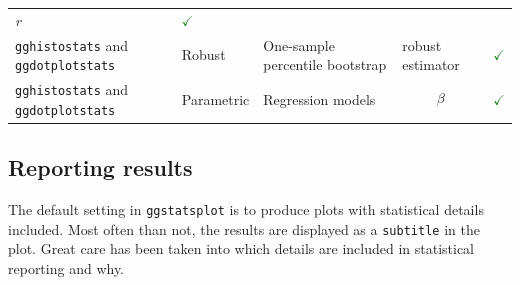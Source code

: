 \documentclass[]{article}
\begin{document}
\begin{longtable}[]{@{}lllll@{}}
\begin{minipage}[t]{0.12\columnwidth}
\emph{r}\strut
\end{minipage} & \begin{minipage}[t]{0.07\columnwidth}\raggedright
\textcolor{ForestGreen}{$\checkmark$}\strut
\end{minipage}\tabularnewline
\begin{minipage}[t]{0.20\columnwidth}\raggedright
\texttt{gghistostats} and \texttt{ggdotplotstats}\strut
\end{minipage} & \begin{minipage}[t]{0.16\columnwidth}\raggedright
Robust\strut
\end{minipage} & \begin{minipage}[t]{0.31\columnwidth}\raggedright
One-sample percentile bootstrap\strut
\end{minipage} & \begin{minipage}[t]{0.12\columnwidth}\raggedright
robust estimator\strut
\end{minipage} & \begin{minipage}[t]{0.07\columnwidth}\raggedright
\textcolor{ForestGreen}{$\checkmark$}\strut
\end{minipage}\tabularnewline
\begin{minipage}[t]{0.20\columnwidth}\raggedright
\texttt{gghistostats} and \texttt{ggdotplotstats}\strut
\end{minipage} & \begin{minipage}[t]{0.16\columnwidth}\raggedright
Parametric\strut
\end{minipage} & \begin{minipage}[t]{0.31\columnwidth}\raggedright
Regression models\strut
\end{minipage} & \begin{minipage}[t]{0.12\columnwidth}\raggedright
\[\beta\]\strut
\end{minipage} & \begin{minipage}[t]{0.07\columnwidth}\raggedright
\textcolor{ForestGreen}{$\checkmark$}\strut
\end{minipage}\tabularnewline
\bottomrule
\end{longtable}

\hypertarget{reporting-results}{%
\subsection{Reporting results}\label{reporting-results}}

The default setting in \texttt{ggstatsplot} is to produce plots with
statistical details included. Most often than not, the results are
displayed as a \texttt{subtitle} in the plot. Great care has been taken
into which details are included in statistical reporting and why.
\end{document}
